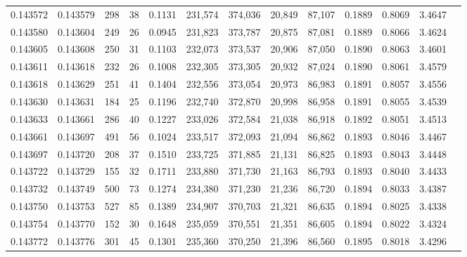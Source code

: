 \begin{tabular}{rrrrrrrrrrrrr}
0.143572 & 0.143579 &   298 &  38 &                                     0.1131 & 231,574 & 374,036 &  20,849 &  87,107 & 0.1889 & 0.8069 & 3.4647 \\
0.143580 & 0.143604 &   249 &  26 &                                     0.0945 & 231,823 & 373,787 &  20,875 &  87,081 & 0.1889 & 0.8066 & 3.4624 \\
0.143605 & 0.143608 &   250 &  31 &                                     0.1103 & 232,073 & 373,537 &  20,906 &  87,050 & 0.1890 & 0.8063 & 3.4601 \\
0.143611 & 0.143618 &   232 &  26 &                                     0.1008 & 232,305 & 373,305 &  20,932 &  87,024 & 0.1890 & 0.8061 & 3.4579 \\
0.143618 & 0.143629 &   251 &  41 &                                     0.1404 & 232,556 & 373,054 &  20,973 &  86,983 & 0.1891 & 0.8057 & 3.4556 \\
0.143630 & 0.143631 &   184 &  25 &                                     0.1196 & 232,740 & 372,870 &  20,998 &  86,958 & 0.1891 & 0.8055 & 3.4539 \\
0.143633 & 0.143661 &   286 &  40 &                                     0.1227 & 233,026 & 372,584 &  21,038 &  86,918 & 0.1892 & 0.8051 & 3.4513 \\
0.143661 & 0.143697 &   491 &  56 &                                     0.1024 & 233,517 & 372,093 &  21,094 &  86,862 & 0.1893 & 0.8046 & 3.4467 \\
0.143697 & 0.143720 &   208 &  37 &                                     0.1510 & 233,725 & 371,885 &  21,131 &  86,825 & 0.1893 & 0.8043 & 3.4448 \\
0.143722 & 0.143729 &   155 &  32 &                                     0.1711 & 233,880 & 371,730 &  21,163 &  86,793 & 0.1893 & 0.8040 & 3.4433 \\
0.143732 & 0.143749 &   500 &  73 &                                     0.1274 & 234,380 & 371,230 &  21,236 &  86,720 & 0.1894 & 0.8033 & 3.4387 \\
0.143750 & 0.143753 &   527 &  85 &                                     0.1389 & 234,907 & 370,703 &  21,321 &  86,635 & 0.1894 & 0.8025 & 3.4338 \\
0.143754 & 0.143770 &   152 &  30 &                                     0.1648 & 235,059 & 370,551 &  21,351 &  86,605 & 0.1894 & 0.8022 & 3.4324 \\
0.143772 & 0.143776 &   301 &  45 &                                     0.1301 & 235,360 & 370,250 &  21,396 &  86,560 & 0.1895 & 0.8018 & 3.4296 \\

\end{tabular}
